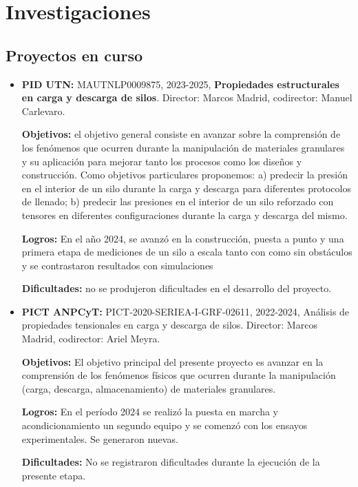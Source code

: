 \documentclass[a4paper,11pt,twoside,final,titlepage,onecolumn,openright]{report}
\begin{document}
\section{Investigaciones}

\subsection{Proyectos en curso}

\begin{itemize}
  
\item {\bf PID UTN:} MAUTNLP0009875, 2023-2025, {\bf Propiedades estructurales en carga y descarga de silos}. Director: Marcos Madrid, codirector: Manuel Carlevaro.
 
{\bf Objetivos:} el objetivo general consiste en avanzar sobre la comprensión de los fenómenos que ocurren durante la manipulación de materiales granulares y su aplicación para mejorar tanto los procesos como los diseños y construcción. Como objetivos particulares proponemos: a) predecir la presión en el interior de un silo durante la carga y descarga para diferentes protocolos de llenado; b) predecir las presiones en el interior de un silo reforzado con tensores en diferentes configuraciones durante la carga y descarga del mismo.

{\bf Logros:} En el año 2024, se avanzó en la construcción, puesta a punto y una primera etapa de mediciones de un silo a escala tanto con como sin obstáculos y se contrastaron resultados con simulaciones
 
{\bf Dificultades:} no se produjeron dificultades en el desarrollo del proyecto. 


\item \textbf{PICT ANPCyT:} PICT-2020-SERIEA-I-GRF-02611, 2022-2024, Análisis de propiedades tensionales en carga y descarga de silos. Director: Marcos Madrid, codirector: Ariel Meyra.

    \textbf{Objetivos:} El objetivo principal del presente proyecto es avanzar en la comprensión de los fenómenos físicos que ocurren durante la manipulación (carga, descarga, almacenamiento) de materiales granulares. 

    \textbf{Logros:} En el período 2024 se realizó la puesta en marcha y acondicionamiento un segundo equipo y se comenzó con los ensayos experimentales. {\color{red}Se generaron nuevas}.


    \textbf{Dificultades:} No se registraron dificultades durante la ejecución de la presente etapa.



\end{itemize}
\end{document}
